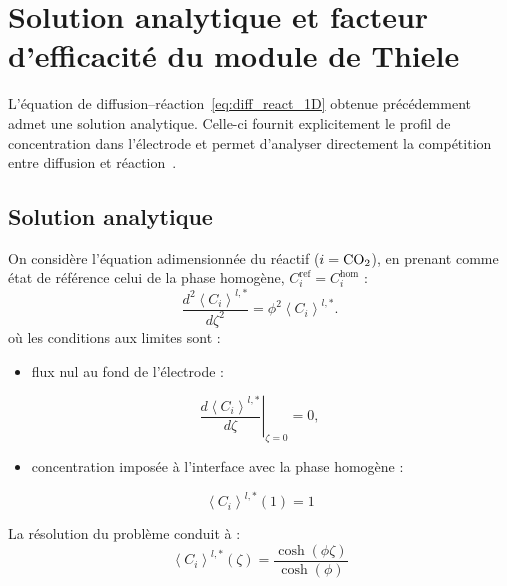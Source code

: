 \section*{Solution analytique et facteur d'efficacité du module de Thiele}

L'équation de diffusion--réaction~\eqref{eq:diff_react_1D} obtenue
précédemment admet une solution analytique. Celle-ci fournit explicitement
le profil de concentration dans l'électrode et permet d'analyser directement
la compétition entre diffusion et réaction~\cite{wanPotentialDependentThiele}.


\subsection*{Solution analytique}

On considère l'équation adimensionnée du réactif ($i = \ce{CO2}$), en prenant
comme état de référence celui de la phase homogène,
$C_i^{\mathrm{ref}} = C_i^{\mathrm{hom}}$ :
\begin{equation}
\frac{d^2\left\langle C_i \right\rangle^{l,*}}{d\zeta^{2}}
=
\phi^2 \left\langle C_i \right\rangle^{l,*}.
\end{equation}
où les conditions aux limites sont :
\begin{itemize}
    \item flux nul au fond de l'électrode :
\end{itemize}
\begin{equation}
\left.
\frac{d\left\langle C_i \right\rangle^{l,*}}{d\zeta}
\right|_{\zeta=0}
=
0,
\end{equation}

\begin{itemize}
    \item concentration imposée à l'interface avec la phase homogène :
\end{itemize}
\begin{equation}
\left\langle C_i \right\rangle^{l,*}(1)
=1
\end{equation}

La résolution du problème conduit à :
\begin{equation}
\boxed{
\left\langle C_i \right\rangle^{l,*}(\zeta)
=
\frac{
\cosh\!\left(\phi\zeta\right)
}{
\cosh(\phi)
}
}
\end{equation}

